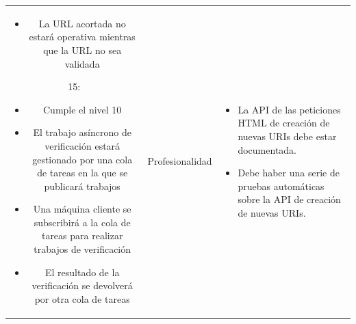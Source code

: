 \documentclass{article}
\begin{document}
\begin{table}[hbtp]
\begin{tabulary}{\textwidth}{ C L }
\begin{itemize}
        \item La URL acortada no estará operativa mientras que la URL no sea
        validada
    \end{itemize} 
    15:
    \begin{itemize}
        \item Cumple el nivel 10
        
        \item El trabajo asíncrono de verificación estará gestionado por una
        cola de tareas en la que se publicará trabajos
        
        \item Una máquina cliente se subscribirá a la cola de tareas para
        realizar trabajos de verificación
        
        \item El resultado de la verificación se devolverá por otra cola de
        tareas
 
 
	\end{itemize} &
 
    Profesionalidad & 
    \begin{itemize}
        \item La API de las peticiones HTML de creación de nuevas URIs debe estar documentada.
	    \item Debe haber una serie de pruebas automáticas sobre la API de creación de nuevas URIs.
    \end{itemize}
 
    \end{tabulary}
\end{table}
 
\end{document}
